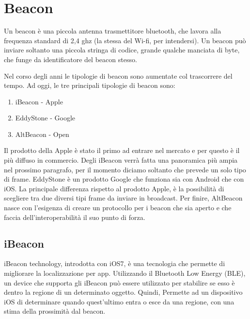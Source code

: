 \chapter{Beacon}
\label{chap:beacon}
Un beacon è una piccola antenna trasmettitore
bluetooth, che lavora alla frequenza standard di 2,4 ghz (la stessa del Wi-fi, per intendersi). Un beacon può inviare soltanto una piccola stringa di
codice, grande qualche manciata di byte, che funge da identificatore del
beacon stesso.

Nel corso degli anni le tipologie di beacon sono aumentate col trascorrere del tempo. Ad oggi, le tre principali tipologie di beacon sono:
\begin{enumerate}
\item iBeacon - Apple
\item EddyStone - Google
\item AltBeacon - Open
\end{enumerate}

Il prodotto della Apple è stato il primo ad entrare nel mercato e per questo è il più diffuso in commercio.
Degli iBeacon verrà fatta una panoramica più ampia nel prossimo paragrafo, per il momento diciamo soltanto che prevede un solo tipo di frame.
EddyStone è un prodotto Google che funziona sia con Android che con iOS. La principale differenza rispetto al prodotto Apple, è la possibilità di scegliere tra due diversi tipi frame da inviare in broadcast. Per finire, AltBeacon nasce con l'esigenza di creare un protocollo per i beacon che sia aperto e che faccia dell'interoperabilità il suo punto di forza.
\section{iBeacon}
iBeacon technology\cite{apple}, introdotta con iOS7, è una tecnologia che permette di migliorare la localizzazione per app.
Utilizzando il Bluetooth Low Energy (BLE), un device che supporta gli iBeacon può essere utilizzato per stabilire se esso è dentro la regione di un determinato oggetto. 
Quindi, Permette ad un dispositivo iOS di determinare quando quest'ultimo entra o esce da una regione, con una stima della prossimità dal beacon.

